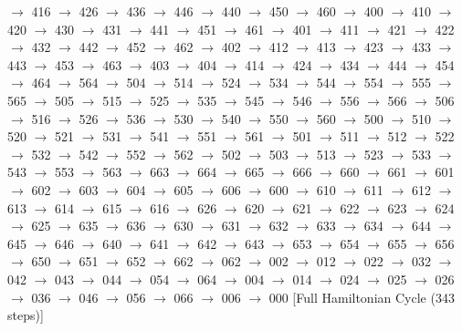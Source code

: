 $\rightarrow$ 416 $\rightarrow$ 426 $\rightarrow$ 436 $\rightarrow$ 446 $\rightarrow$ 440 $\rightarrow$ 450 $\rightarrow$ 460 $\rightarrow$ 400 $\rightarrow$ 410 $\rightarrow$ 420 $\rightarrow$ 430 $\rightarrow$ 431 $\rightarrow$ 441 $\rightarrow$ 451 $\rightarrow$ 461 $\rightarrow$ 401 $\rightarrow$ 411 $\rightarrow$ 421 $\rightarrow$ 422 $\rightarrow$ 432 $\rightarrow$ 442 $\rightarrow$ 452 $\rightarrow$ 462 $\rightarrow$ 402 $\rightarrow$ 412 $\rightarrow$ 413 $\rightarrow$ 423 $\rightarrow$ 433 $\rightarrow$ 443 $\rightarrow$ 453 $\rightarrow$ 463 $\rightarrow$ 403 $\rightarrow$ 404 $\rightarrow$ 414 $\rightarrow$ 424 $\rightarrow$ 434 $\rightarrow$ 444 $\rightarrow$ 454 $\rightarrow$ 464 $\rightarrow$ 564 $\rightarrow$ 504 $\rightarrow$ 514 $\rightarrow$ 524 $\rightarrow$ 534 $\rightarrow$ 544 $\rightarrow$ 554 $\rightarrow$ 555 $\rightarrow$ 565 $\rightarrow$ 505 $\rightarrow$ 515 $\rightarrow$ 525 $\rightarrow$ 535 $\rightarrow$ 545 $\rightarrow$ 546 $\rightarrow$ 556 $\rightarrow$ 566 $\rightarrow$ 506 $\rightarrow$ 516 $\rightarrow$ 526 $\rightarrow$ 536 $\rightarrow$ 530 $\rightarrow$ 540 $\rightarrow$ 550 $\rightarrow$ 560 $\rightarrow$ 500 $\rightarrow$ 510 $\rightarrow$ 520 $\rightarrow$ 521 $\rightarrow$ 531 $\rightarrow$ 541 $\rightarrow$ 551 $\rightarrow$ 561 $\rightarrow$ 501 $\rightarrow$ 511 $\rightarrow$ 512 $\rightarrow$ 522 $\rightarrow$ 532 $\rightarrow$ 542 $\rightarrow$ 552 $\rightarrow$ 562 $\rightarrow$ 502 $\rightarrow$ 503 $\rightarrow$ 513 $\rightarrow$ 523 $\rightarrow$ 533 $\rightarrow$ 543 $\rightarrow$ 553 $\rightarrow$ 563 $\rightarrow$ 663 $\rightarrow$ 664 $\rightarrow$ 665 $\rightarrow$ 666 $\rightarrow$ 660 $\rightarrow$ 661 $\rightarrow$ 601 $\rightarrow$ 602 $\rightarrow$ 603 $\rightarrow$ 604 $\rightarrow$ 605 $\rightarrow$ 606 $\rightarrow$ 600 $\rightarrow$ 610 $\rightarrow$ 611 $\rightarrow$ 612 $\rightarrow$ 613 $\rightarrow$ 614 $\rightarrow$ 615 $\rightarrow$ 616 $\rightarrow$ 626 $\rightarrow$ 620 $\rightarrow$ 621 $\rightarrow$ 622 $\rightarrow$ 623 $\rightarrow$ 624 $\rightarrow$ 625 $\rightarrow$ 635 $\rightarrow$ 636 $\rightarrow$ 630 $\rightarrow$ 631 $\rightarrow$ 632 $\rightarrow$ 633 $\rightarrow$ 634 $\rightarrow$ 644 $\rightarrow$ 645 $\rightarrow$ 646 $\rightarrow$ 640 $\rightarrow$ 641 $\rightarrow$ 642 $\rightarrow$ 643 $\rightarrow$ 653 $\rightarrow$ 654 $\rightarrow$ 655 $\rightarrow$ 656 $\rightarrow$ 650 $\rightarrow$ 651 $\rightarrow$ 652 $\rightarrow$ 662 $\rightarrow$ 062 $\rightarrow$ 002 $\rightarrow$ 012 $\rightarrow$ 022 $\rightarrow$ 032 $\rightarrow$ 042 $\rightarrow$ 043 $\rightarrow$ 044 $\rightarrow$ 054 $\rightarrow$ 064 $\rightarrow$ 004 $\rightarrow$ 014 $\rightarrow$ 024 $\rightarrow$ 025 $\rightarrow$ 026 $\rightarrow$ 036 $\rightarrow$ 046 $\rightarrow$ 056 $\rightarrow$ 066 $\rightarrow$ 006 $\rightarrow$ 000 [Full Hamiltonian Cycle (343 steps)]

